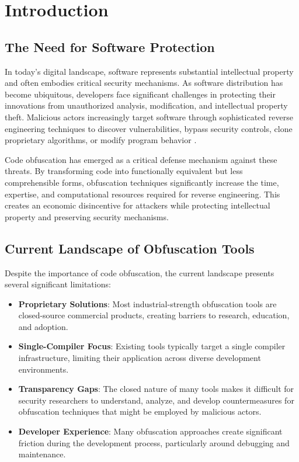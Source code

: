 \documentclass[conference]{IEEEtran}
\begin{document}
\section{Introduction}

\subsection{The Need for Software Protection}
In today's digital landscape, software represents substantial intellectual property and often embodies critical security mechanisms. As software distribution has become ubiquitous, developers face significant challenges in protecting their innovations from unauthorized analysis, modification, and intellectual property theft. Malicious actors increasingly target software through sophisticated reverse engineering techniques to discover vulnerabilities, bypass security controls, clone proprietary algorithms, or modify program behavior \cite{collberg1997taxonomy}.

Code obfuscation has emerged as a critical defense mechanism against these threats. By transforming code into functionally equivalent but less comprehensible forms, obfuscation techniques significantly increase the time, expertise, and computational resources required for reverse engineering. This creates an economic disincentive for attackers while protecting intellectual property and preserving security mechanisms.

\subsection{Current Landscape of Obfuscation Tools}
Despite the importance of code obfuscation, the current landscape presents several significant limitations:

\begin{itemize}
    \item \textbf{Proprietary Solutions}: Most industrial-strength obfuscation tools are closed-source commercial products, creating barriers to research, education, and adoption.
    
    \item \textbf{Single-Compiler Focus}: Existing tools typically target a single compiler infrastructure, limiting their application across diverse development environments.
    
    \item \textbf{Transparency Gaps}: The closed nature of many tools makes it difficult for security researchers to understand, analyze, and develop countermeasures for obfuscation techniques that might be employed by malicious actors.
    
    \item \textbf{Developer Experience}: Many obfuscation approaches create significant friction during the development process, particularly around debugging and maintenance.
\end{itemize}
\end{document}
